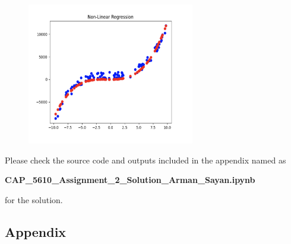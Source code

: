 \documentclass[12pt,letterpaper, onecolumn]{exam}
\begin{document}
\begin{questions}
    \begin{figure}[h]
        \centering
        \includegraphics[width=0.65\textwidth]{non-linear.png}
    \end{figure}

    \begin{solution}

        Please check the source code and outputs included in the appendix named as

        \begin{center}
            \textbf{CAP\_5610\_Assignment\_2\_Solution\_Arman\_Sayan.ipynb}
        \end{center}
        
        for the solution.
    \end{solution}

    \pagebreak
    
\end{questions}

\begin{appendix}
    \centering
    \begin{flushleft}  
      \section{Appendix}
      
    \end{flushleft}
\end{appendix}
\end{document}
